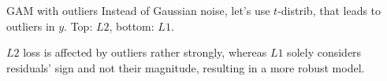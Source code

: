 
\begin{frame}{GAM with outliers}
Instead of Gaussian noise, let's use $t$-distrib, that leads 
to outliers in $y$.
Top: $L2$, bottom: $L1$.

\vfill


\vfill

\footnotesize

$L2$ loss is affected by outliers rather strongly, whereas $L1$ solely considers 
residuals' sign and not their magnitude, resulting in a more robust model.

\end{frame}


